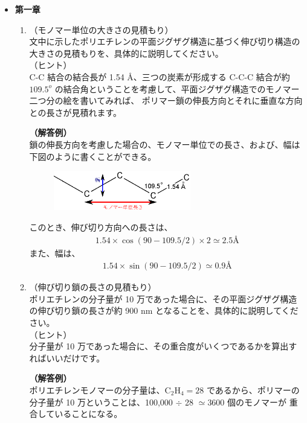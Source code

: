 \documentclass[11pt]{jsarticle}
\begin{document}
\begin{itemize}
\item
{\bf 第一章}

	\begin{enumerate}
		\item
		（モノマー単位の大きさの見積もり）\\
		文中に示したポリエチレンの平面ジグザグ構造に基づく伸び切り構造の大きさの見積もりを、具体的に説明してください。\\
		（ヒント）\\
		C-C 結合の結合長が 1.54 \AA、三つの炭素が形成する C-C-C 結合が約 $109.5^o$ の結合角ということを考慮して、平面ジグザグ構造でのモノマー二つ分の絵を書いてみれば、
		ポリマー鎖の伸長方向とそれに垂直な方向との長さが見積れます。

		{\bf（解答例）}\\
		鎖の伸長方向を考慮した場合の、モノマー単位での長さ、および、幅は下図のように書くことができる。
		\begin{figure}[htb]
		\centering
		\includegraphics[width=6cm]{figure/fig1.eps}
		\end{figure}

		このとき、伸び切り方向への長さは、
		\begin{align*}
		1.54 \times \cos (90 - 109.5/2) \times 2 \simeq 2.5 \text{\AA}
		\end{align*}
		また、幅は、
		\begin{align*}
		1.54 \times \sin (90 - 109.5/2) \simeq 0.9 \text{\AA}
		\end{align*}

		\item
		（伸び切り鎖の長さの見積もり）\\
		ポリエチレンの分子量が 10 万であった場合に、その平面ジグザグ構造の伸び切り鎖の長さが約 900 nm となることを、具体的に説明してください。\\
		（ヒント）\\
		分子量が 10 万であった場合に、その重合度がいくつであるかを算出すればいいだけです。

		{\bf（解答例）}\\
		ポリエチレンモノマーの分子量は、C$_2$H$_4 = 28$ であるから、ポリマーの分子量が 10 万ということは、100,000 $\div$ 28 $\simeq $3600 個のモノマーが
		重合していることになる。


\end{enumerate}
\end{itemize}
\end{document}
